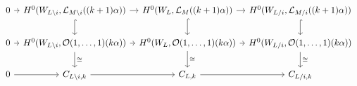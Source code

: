\documentclass{amsart}
\theoremstyle{definition}
\begin{document}
\begin{equation}\label{section-diagram}
\begin{tikzcd}[column sep = tiny]
0 \arrow[r] & H^0(W_{L\setminus i}, \mathcal{L}_{M\setminus i}((k+1)\alpha)) \arrow[d, hook] \arrow[r]                                          & H^0(W_L, \mathcal{L}_{M}((k+1)\alpha)) \arrow[d, hook] \arrow[r]                                             & H^0(W_{L/i}, \mathcal{L}_{M/i}((k+1)\alpha)) \arrow[d, hook]  \\
0 \arrow[r] & {H^0(W_{L \setminus i}, \mathcal{O}(1, \ldots,1)(k\alpha))} \arrow[r] \arrow[d, "\cong"] & {H^0(W_L, \mathcal{O}(1, \ldots, 
                1)(k\alpha))} \arrow[r] \arrow[d, "\cong"] & {H^0(W_{L/i}, \mathcal{O}(1, \ldots, 
            1)(k\alpha))} \arrow[d, "\cong"]  \\
0 \arrow[r] & {C_{L\setminus i,k}} \arrow[r]                                                                                 & {C_{L,k}} \arrow[r]                                                                                    & {C_{L/i,k}}
\end{tikzcd}
\end{equation}
\end{document}
